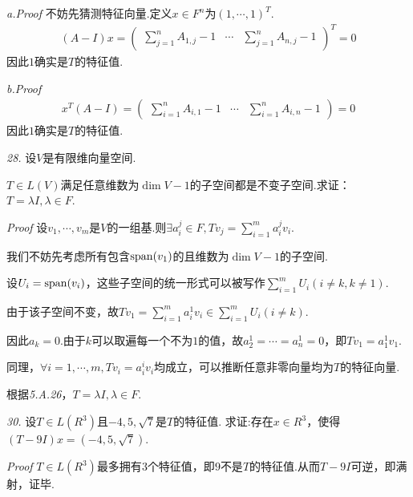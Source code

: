 \textit{a.Proof}
不妨先猜测特征向量.定义\(x \in F^n\)为\((1,\cdots,1)^T\).
    \begin{align*}
        (A-I)x=
            \begin{pmatrix}
                \sum_{j=1}^n A_{1,j}-1 & \cdots & \sum_{j=1}^n A_{n,j}-1
            \end{pmatrix}^T
            =0
    \end{align*}
因此\(1\)确实是\(T\)的特征值.

\textit{b.Proof}
    \begin{align*}
        x^T(A-I)=
            \begin{pmatrix}
                \sum_{i=1}^n A_{i,1}-1 & \cdots & \sum_{i=1}^n A_{i,n}-1
            \end{pmatrix}
                =0
    \end{align*}
因此\(1\)确实是\(T\)的特征值.

\hspace*{\fill}

\textit{28.}
设\(V\)是有限维向量空间.

\(T \in L(V)\)满足任意维数为\(\dim V-1\)的子空间都是不变子空间.求证：\(T=\lambda I,\lambda \in F\).

\textit{Proof}
设\(v_1,\cdots,v_m\)是\(V\)的一组基.则\(\exists a_i^j \in F,Tv_j=\sum_{i=1}^m a_i^j v_i\).

我们不妨先考虑所有包含\(\mathrm{span} (v_1)\)的且维数为\(\dim V-1\)的子空间.

设\(U_i=\mathrm{span} (v_i)\)，这些子空间的统一形式可以被写作\(\sum_{i=1}^m U_i(i \ne k,k \ne 1)\).

由于该子空间不变，故\(Tv_1=\sum_{i=1}^m a_i^1 v_i \in \sum_{i=1}^m U_i(i \ne k)\).

因此\(a_{k}=0\).由于\(k\)可以取遍每一个不为\(1\)的值，故\(a_2^1=\cdots=a_n^1=0\)，即\(Tv_1=a_1^1 v_1\).

同理，\(\forall i=1,\cdots,m,Tv_i=a_i^i v_i\)均成立，可以推断任意非零向量均为\(T\)的特征向量.

根据\textit{5.A.26}，\(T=\lambda I,\lambda \in F\).

\hspace*{\fill}

\textit{30.}
设\(T \in L(R^3)\)且\(-4,5,\sqrt{7}\)是\(T\)的特征值.
求证:存在\(x \in R^3\)，使得\((T-9I)x=(-4,5,\sqrt{7})\).

\textit{Proof}
\(T \in L(R^3)\)最多拥有\(3\)个特征值，即\(9\)不是\(T\)的特征值.从而\(T-9I\)可逆，即满射，证毕.

\newpage


